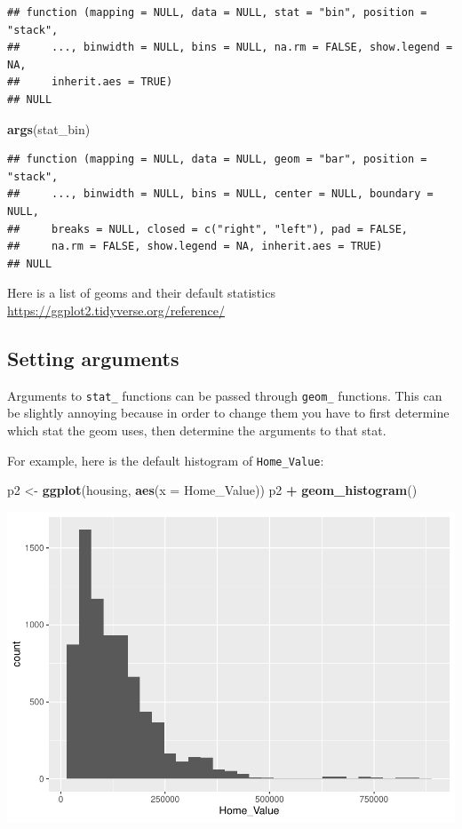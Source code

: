 \documentclass[]{book}
\newenvironment{Shaded}{\begin{snugshade}}{\end{snugshade}}
\newcommand{\DataTypeTok}[1]{\textcolor[rgb]{0.13,0.29,0.53}{#1}}
\newcommand{\KeywordTok}[1]{\textcolor[rgb]{0.13,0.29,0.53}{\textbf{#1}}}
\newcommand{\NormalTok}[1]{#1}
\newcommand{\OperatorTok}[1]{\textcolor[rgb]{0.81,0.36,0.00}{\textbf{#1}}}
\newcommand{\StringTok}[1]{\textcolor[rgb]{0.31,0.60,0.02}{#1}}
\begin{document}
\begin{verbatim}
## function (mapping = NULL, data = NULL, stat = "bin", position = "stack", 
##     ..., binwidth = NULL, bins = NULL, na.rm = FALSE, show.legend = NA, 
##     inherit.aes = TRUE) 
## NULL
\end{verbatim}

\begin{Shaded}
\begin{Highlighting}[]
\KeywordTok{args}\NormalTok{(stat_bin)}
\end{Highlighting}
\end{Shaded}

\begin{verbatim}
## function (mapping = NULL, data = NULL, geom = "bar", position = "stack", 
##     ..., binwidth = NULL, bins = NULL, center = NULL, boundary = NULL, 
##     breaks = NULL, closed = c("right", "left"), pad = FALSE, 
##     na.rm = FALSE, show.legend = NA, inherit.aes = TRUE) 
## NULL
\end{verbatim}

Here is a list of geoms and their default statistics \url{https://ggplot2.tidyverse.org/reference/}

\hypertarget{setting-arguments}{%
\subsection{Setting arguments}\label{setting-arguments}}

Arguments to \texttt{stat\_} functions can be passed through \texttt{geom\_} functions. This can be slightly annoying because in order to change them you have to first determine which stat the geom uses, then determine the arguments to that stat.

For example, here is the default histogram of \texttt{Home\_Value}:

\begin{Shaded}
\begin{Highlighting}[]
\NormalTok{p2 <-}\StringTok{ }\KeywordTok{ggplot}\NormalTok{(housing, }\KeywordTok{aes}\NormalTok{(}\DataTypeTok{x =}\NormalTok{ Home_Value))}
\NormalTok{p2 }\OperatorTok{+}\StringTok{ }\KeywordTok{geom_histogram}\NormalTok{()}
\end{Highlighting}
\end{Shaded}

\includegraphics{R/Rgraphics/figures/unnamed-chunk-165-1.pdf}
\end{document}
